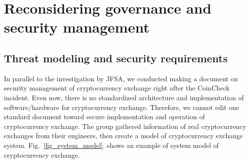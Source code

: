 \section{Reconsidering governance and security management}
\subsection{Threat modeling and security requirements}
\setcounter{figure}{2}
In parallel to the investigation by JFSA, we conducted making a document on security management of cryptocurrency exchange right after the CoinCheck incident.
%
Even now, there is no standardized architecture and implementation of software/hardware for cryptocurrency exchange. Therefore, we cannot edit one standard document toward secure implementation and operation of cryptocurrency exchange. The group gathered information of real cryptocurrency exchanges from their engineers, then create a model of cryptocurrency exchange system. Fig.~\ref{fig_system_model}. shows an example of system model of cryptocurrency exchange.
%

